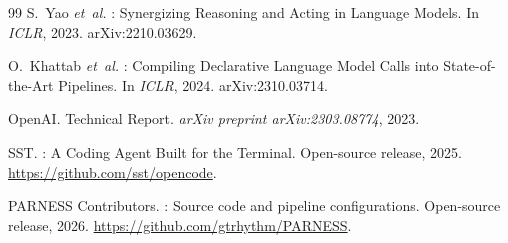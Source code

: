 \documentclass{article}
\newcommand{\parness}{\textsf{PARNESS}}
\begin{document}
\begin{thebibliography}{99}
S.~Yao \emph{et~al.}
: Synergizing Reasoning and Acting in Language Models.
\newblock In \emph{ICLR}, 2023.
\newblock arXiv:2210.03629.

O.~Khattab \emph{et~al.}
: Compiling Declarative Language Model Calls into State-of-the-Art Pipelines.
\newblock In \emph{ICLR}, 2024.
\newblock arXiv:2310.03714.

{OpenAI}.
 Technical Report.
\newblock \emph{arXiv preprint arXiv:2303.08774}, 2023.

{SST}.
: A Coding Agent Built for the Terminal.
\newblock Open-source release, 2025.
\newblock \url{https://github.com/sst/opencode}.

{\parness{} Contributors}.
: Source code and pipeline configurations.
\newblock Open-source release, 2026.
\newblock \url{https://github.com/gtrhythm/PARNESS}.

\end{thebibliography}


\end{document}

